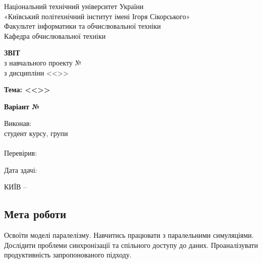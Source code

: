 \documentclass[14pt, a4paper]{extreport}
\begin{document}
	
	\begin{titlepage}
		\begin{center}
			\normalsize
			Національний технічний університет України\\
			«Київський політехнічний інститут імені Ігоря Сікорського» \\[0.5em]
			Факультет інформатики та обчислювальної техніки\\
			Кафедра обчислювальної техніки
			
			\vfill
			
			{\large \textbf{ЗВІТ}\\[0.5em]}
			{з навчального проекту №\LabNumber \\}
			{з дисципліни <<\CourseTitle>>}
			
			\vspace{2em}
			
			{\textbf{Тема: <<\Topic>>}}
			
			\vspace{1em}
			
			{\textbf{Варіант №\Variant}}
			
			\vfill
			
			\begin{flushright}
				Виконав: \\ студент \CourseNumber{} курсу, групи \StudentGroup \\
				\StudentName \\[1em]
				Перевірив: \\ \Teacher
			\end{flushright}
			
			\vfill
			
			\begin{flushright}
				Дата здачі: \DTMtoday
			\end{flushright}
			
			\vspace{5em}
			КИЇВ -- \ReportYear
		\end{center}
	\end{titlepage}
	
	\clearpage
	\setcounter{page}{2}
	
	\subsection*{Мета роботи} 
	
	Освоїти моделі паралелізму. Навчитись працювати з паралельними симуляціями. Дослідити проблеми синхронізації та спільного доступу до даних. Проаналізувати продуктивність запропонованого підходу.
	
\end{document}
